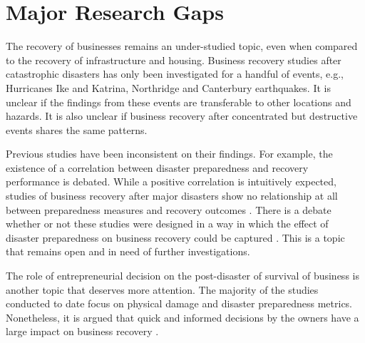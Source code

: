 \section{Major Research Gaps} 
The recovery of businesses remains an under-studied topic, even when compared to the recovery of infrastructure and housing. Business recovery studies after catastrophic disasters has only been investigated for a handful of events, e.g., Hurricanes Ike and Katrina, Northridge and Canterbury earthquakes. It is unclear if the findings from these events are transferable to other locations and hazards. It is also unclear if business recovery after concentrated but destructive events shares the same patterns. \ 

Previous studies have been inconsistent on their findings. For example, the existence of a correlation between disaster preparedness and recovery performance is debated. While a positive correlation is intuitively expected, studies of business recovery after major disasters show no relationship at all between preparedness measures and recovery outcomes \cite{webb2000businesses}. There is a debate whether or not these studies were designed in a way in which the effect of disaster preparedness on business recovery could be captured \citep{xiao2014hazard}. This is a topic that remains open and in need of further investigations.\ 

The role of entrepreneurial decision on the post-disaster of survival of business is another topic that deserves more attention. The majority of the studies conducted to date focus on physical damage and disaster preparedness metrics. Nonetheless, it is argued that quick and informed decisions by the owners have a large impact on business recovery \citep{morrish2020post}.\

